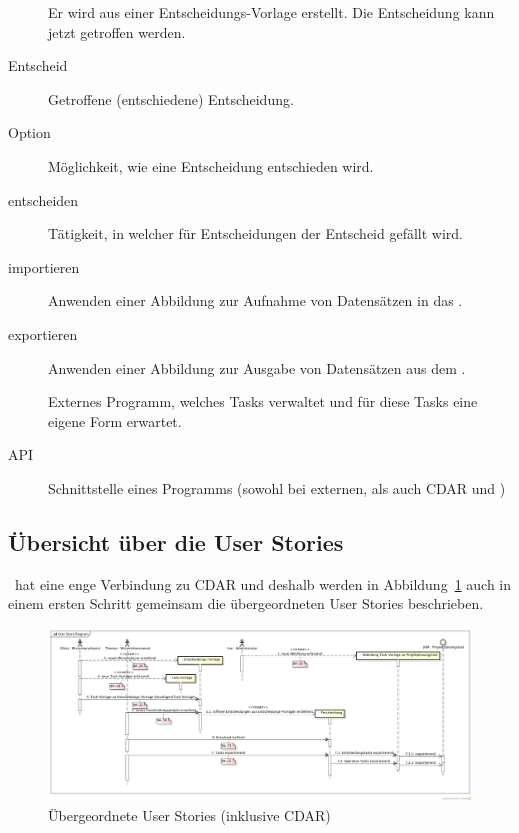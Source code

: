 \begin{description}
				Er wird aus einer Entscheidungs-Vorlage erstellt.
				Die Entscheidung kann jetzt getroffen werden.
			\item[Entscheid] Getroffene (entschiedene) Entscheidung.
			\item[Option] Möglichkeit, wie eine Entscheidung entschieden wird.
			\item[entscheiden] Tätigkeit, in welcher für Entscheidungen der Entscheid gefällt wird.
			\item[importieren] Anwenden einer Abbildung zur Aufnahme von Datensätzen in das \eeppi.
			\item[exportieren] Anwenden einer Abbildung zur Ausgabe von Datensätzen aus dem \eeppi.
			\item[\ppt] Externes Programm, welches Tasks verwaltet und für diese Tasks eine eigene Form erwartet.
			\item[API] Schnittstelle eines Programms (sowohl bei externen, als auch CDAR und \eeppi)
		\end{description}

	\subsection{Übersicht über die User Stories}
	
		\eeppi\ hat eine enge Verbindung zu CDAR und deshalb werden in Abbildung~\ref{fig:UserStoryDiagram} auch in einem ersten Schritt gemeinsam die übergeordneten User Stories beschrieben.
	
		\begin{figure}[H]
			\begin{minipage}[b]{\linewidth}
				\includegraphics[width=\textwidth]{media/diagrams/UserStoryDiagram.png}
				\centering
				\caption{Übergeordnete User Stories (inklusive CDAR)}
				\label{fig:UserStoryDiagram}
			\end{minipage}
		\end{figure}
		
